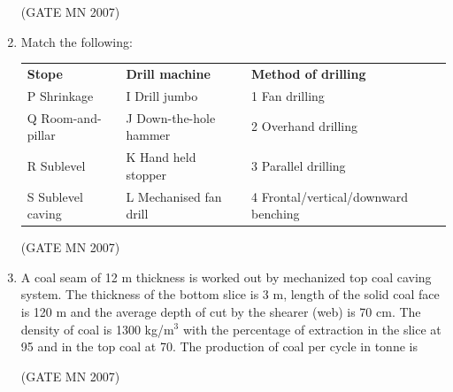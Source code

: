 \documentclass[journal]{IEEEtran}
\begin{document}
\begin{enumerate}
\hfill (GATE MN 2007)

\item Match the following:

\begin{tabular}{p{3cm} p{4cm} p{6cm}}
\textbf{Stope} & \textbf{Drill machine} & \textbf{Method of drilling} \\
P \quad Shrinkage & I \quad Drill jumbo & 1 \quad Fan drilling \\
Q \quad Room-and-pillar & J \quad Down-the-hole hammer & 2 \quad Overhand drilling \\
R \quad Sublevel & K \quad Hand held stopper & 3 \quad Parallel drilling \\
S \quad Sublevel caving & L \quad Mechanised fan drill & 4 \quad Frontal/vertical/downward benching \\
\end{tabular}

\begin{enumerate}
\end{enumerate}

\hfill (GATE MN 2007)


\item A coal seam of 12 m thickness is worked out by mechanized top coal caving system. The thickness of the bottom slice is 3 m, length of the solid coal face is 120 m and the average depth of cut by the shearer (web) is 70 cm. The density of coal is 1300 kg/m$^3$ with the percentage of extraction in the slice at 95 and in the top coal at 70. The production of coal per cycle in tonne is  
\begin{enumerate}
\end{enumerate}

\hfill (GATE MN 2007)


\end{enumerate}
\end{document}
